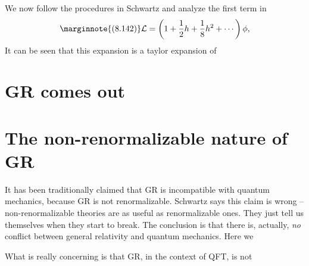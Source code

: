 \documentclass[hyperref, a4paper]{article}
\begin{document}
We now follow the procedures in Schwartz and analyze the first term in 
\begin{equation} \marginnote{(8.142)}
    \mathcal{L} = \left(1 + \frac{1}{2} h + \frac{1}{8} h^2 + \cdots \right) \phi,
\end{equation}
It can be seen that this expansion is a taylor expansion of  

\section{GR comes out}

\section{The non-renormalizable nature of GR} 

It has been traditionally claimed that GR is incompatible with quantum mechanics, because GR is not renormalizable. 
Schwartz says this claim is wrong -- non-renormalizable theories are as useful as renormalizable ones. They just 
tell us themselves when they start to break. 
The conclusion is that there is, actually, \emph{no} conflict between general relativity and quantum mechanics.
Here we 

What is really concerning is that GR, in the context of QFT, is not 


 
\end{document}
